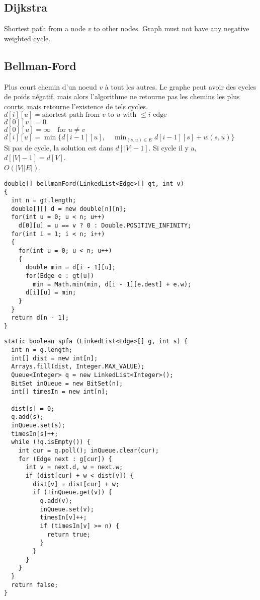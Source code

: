 \subsection{Dijkstra}
Shortest path from a node $v$ to other nodes. Graph must not have any negative weighted cycle.\\


\subsection{Bellman-Ford\label{BellmanFord}}
Plus court chemin d'un noeud $v$ à tout les autres. Le graphe peut avoir des cycles de poids négatif, mais alors l'algorithme ne retourne pas les chemins les plus courts, mais retourne l'existence de tels cycles.\\
$d[i][u] = \text{shortest path from $v$ to $u$ with $\leq i$ edge}$\\
$d[0][v] = 0$ \\
$d[0][u] = \infty \quad \text{for $u \neq v$}$\\
$d[i][u] = \min \{ 
d[i - 1][u], \quad
\min_{(s, u) \in E} d[i - 1][s] + w(s, u) \}$\\
Si pas de cycle, la solution est dans $d[|V|-1]$. Si cycle il y a, $d[|V|-1]=d[V]$.\\
$O(|V||E|)$.\\

\begin{lstlisting}
double[] bellmanFord(LinkedList<Edge>[] gt, int v)
{
  int n = gt.length;
  double[][] d = new double[n][n];
  for(int u = 0; u < n; u++)
    d[0][u] = u == v ? 0 : Double.POSITIVE_INFINITY;
  for(int i = 1; i < n; i++)
  {
    for(int u = 0; u < n; u++)
    {
      double min = d[i - 1][u];
      for(Edge e : gt[u])
        min = Math.min(min, d[i - 1][e.dest] + e.w);
      d[i][u] = min;
    }
  }
  return d[n - 1];
}
\end{lstlisting}
\begin{lstlisting}
static boolean spfa (LinkedList<Edge>[] g, int s) {
  int n = g.length;
  int[] dist = new int[n];
  Arrays.fill(dist, Integer.MAX_VALUE);
  Queue<Integer> q = new LinkedList<Integer>();
  BitSet inQueue = new BitSet(n);
  int[] timesIn = new int[n];

  dist[s] = 0;
  q.add(s);
  inQueue.set(s);
  timesIn[s]++;
  while (!q.isEmpty()) {
    int cur = q.poll(); inQueue.clear(cur);
    for (Edge next : g[cur]) {
      int v = next.d, w = next.w;
      if (dist[cur] + w < dist[v]) {
        dist[v] = dist[cur] + w;
        if (!inQueue.get(v)) {
          q.add(v);
          inQueue.set(v);
          timesIn[v]++;
          if (timesIn[v] >= n) {
            return true;
          }
        }
      }
    }
  }
  return false;
}
\end{lstlisting}
